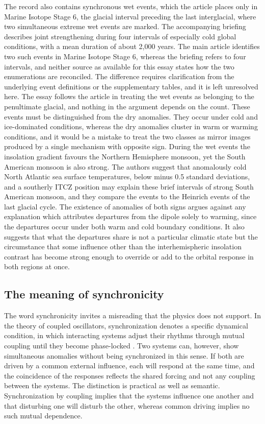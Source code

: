 \documentclass[11pt]{article}
\theoremstyle{definition}
\begin{document}
The record also contains synchronous wet events, which the article places only in Marine Isotope Stage 6, the glacial interval preceding the last interglacial, where two simultaneous extreme wet events are marked. The accompanying briefing describes joint strengthening during four intervals of especially cold global conditions, with a mean duration of about 2,000 years. The main article identifies two such events in Marine Isotope Stage 6, whereas the briefing refers to four intervals, and neither source as available for this essay states how the two enumerations are reconciled. The difference requires clarification from the underlying event definitions or the supplementary tables, and it is left unresolved here. The essay follows the article in treating the wet events as belonging to the penultimate glacial, and nothing in the argument depends on the count. These events must be distinguished from the dry anomalies. They occur under cold and ice-dominated conditions, whereas the dry anomalies cluster in warm or warming conditions, and it would be a mistake to treat the two classes as mirror images produced by a single mechanism with opposite sign. During the wet events the insolation gradient favours the Northern Hemisphere monsoon, yet the South American monsoon is also strong. The authors suggest that anomalously cold North Atlantic sea surface temperatures, below minus 0.5 standard deviations, and a southerly ITCZ position may explain these brief intervals of strong South American monsoon, and they compare the events to the Heinrich events of the last glacial cycle. The existence of anomalies of both signs argues against any explanation which attributes departures from the dipole solely to warming, since the departures occur under both warm and cold boundary conditions. It also suggests that what the departures share is not a particular climatic state but the circumstance that some influence other than the interhemispheric insolation contrast has become strong enough to override or add to the orbital response in both regions at once.

\subsection{The meaning of synchronicity}

The word synchronicity invites a misreading that the physics does not support. In the theory of coupled oscillators, synchronization denotes a specific dynamical condition, in which interacting systems adjust their rhythms through mutual coupling until they become phase-locked \citep[see][]{pikovsky2001}. Two systems can, however, show simultaneous anomalies without being synchronized in this sense. If both are driven by a common external influence, each will respond at the same time, and the coincidence of the responses reflects the shared forcing and not any coupling between the systems. The distinction is practical as well as semantic. Synchronization by coupling implies that the systems influence one another and that disturbing one will disturb the other, whereas common driving implies no such mutual dependence.
\end{document}
